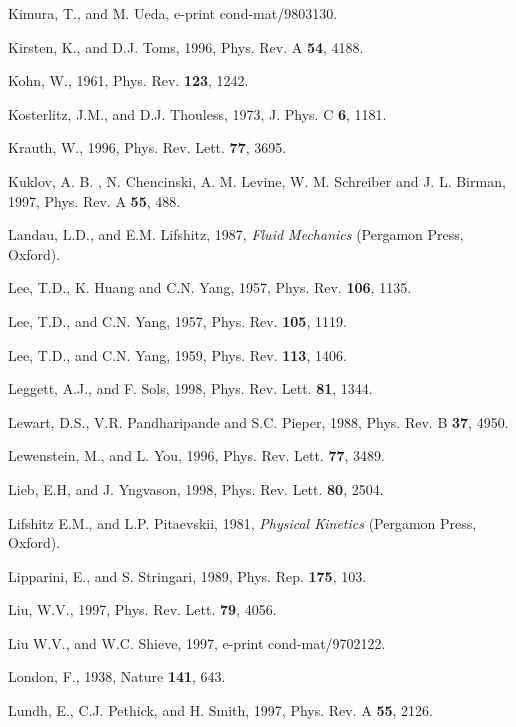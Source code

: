 \begin{references}
   Kimura, T., and M. Ueda, e-print cond-mat/9803130.

  Kirsten, K., and D.J.  Toms, 1996, Phys. Rev. A
{\bf 54}, 4188.

       Kohn, W., 1961, Phys. Rev. {\bf 123}, 1242.

   Kosterlitz, J.M., and D.J. Thouless, 1973, J. Phys.
C {\bf 6}, 1181. 

   Krauth, W., 1996, Phys. Rev. Lett. {\bf 77}, 3695.

   Kuklov, A. B. , N. Chencinski, A. M. Levine, W. M.
Schreiber  and J. L. Birman, 1997, Phys. Rev. A {\bf 55}, 488.

     Landau, L.D., and E.M. Lifshitz, 1987, {\it Fluid
Mechanics}  (Pergamon Press, Oxford).

      Lee, T.D., K. Huang and C.N. Yang, 1957, Phys. Rev.
{\bf 106}, 1135.

      Lee, T.D., and C.N. Yang, 1957, Phys. Rev. {\bf
105}, 1119. 

      Lee, T.D., and C.N. Yang, 1959, Phys. Rev. {\bf
113}, 1406.

    Leggett, A.J., and F. Sols, 1998, Phys. Rev. Lett.
{\bf 81}, 1344. 

   Lewart, D.S., V.R. Pandharipande and S.C. Pieper,
1988, Phys. Rev. B {\bf 37}, 4950.

 Lewenstein, M., and L. You, 1996, Phys. Rev.
Lett. {\bf 77}, 3489.

 Lieb, E.H, and J. Yngvason, 1998, Phys. Rev. Lett. 
{\bf 80}, 2504.

   Lifshitz E.M., and L.P. Pitaevskii, 1981, {\it
Physical Kinetics} (Pergamon Press, Oxford).

 Lipparini, E., and S. Stringari, 1989, Phys. Rep.
{\bf 175}, 103.

        Liu, W.V., 1997, Phys. Rev. Lett. {\bf 79}, 4056.

      Liu W.V., and W.C. Shieve, 1997, e-print
cond-mat/9702122.

   London, F., 1938, Nature {\bf 141}, 643.

     Lundh, E., C.J. Pethick, and H. Smith, 1997, Phys.
Rev. A {\bf 55}, 2126.


\end{references}
